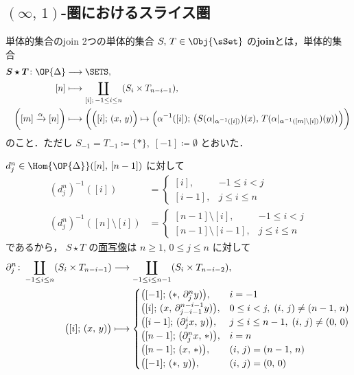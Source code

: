 \documentclass[TQFT_main]{subfiles}
\begin{document}
\subsection{{$(\infty,\, 1)$}-圏におけるスライス圏}

\begin{mydef}[label=def:Simp-Join]{単体的集合のjoin}
    2つの単体的集合 $S,\, T \in \Obj{\sSet}$ の\textbf{join}とは，単体的集合
    \begin{align}
        \bm{S \star T} \colon \OP{\Delta} &\lto \SETS, \\
        [n] &\lmto \coprod_{[i];\, -1 \le i \le n} (S_i \times T_{n-i-1}), \\
        \biggl( [m] \xrightarrow{\alpha} [n] \biggr) &\lmto \biggl( \Bigl( [i];\, (x,\, y) \Bigr) \mapsto \Bigl( \alpha^{-1}([i]);\, \bigl(S(\alpha|_{\alpha^{-1}([i])})(x),\, T(\alpha|_{\alpha^{-1}([m]\setminus[i])})(y) \bigr)  \Bigr)  \biggr) 
    \end{align}
    のこと．ただし $S_{-1} = T_{-1} \coloneqq \{*\},\; [-1] \coloneqq \emptyset$ とおいた．
\end{mydef}
$d^n_j \in \Hom{\OP{\Delta}}([n],\, [n-1])$ に対して
\begin{align}
    (d^n_j)^{-1} ([i]) &= 
    \begin{cases}
        [i], &-1 \le i < j \\
        [i-1], &j \le i \le n
    \end{cases} 
    \\
    (d^n_j)^{-1} ([n]\setminus [i]) &= \begin{cases}
        [n-1]\setminus [i], &-1 \le i < j \\
        [n-1]\setminus [i-1], &j \le i \le n
    \end{cases}
\end{align}
であるから，
$S \star T$ の\hyperref[def:SimpSet]{面写像}は $n \ge 1,\, 0 \le j \le n$ に対して
\begin{align}
    \label{eq:face-join}
    \partial^n_j \colon \coprod_{-1 \le i \le n} (S_i \times T_{n-i-1}) &\longrightarrow \coprod_{-1 \le i \le n-1} (S_i \times T_{n-i-2}), \\
    \bigl([i];\, (x,\, y) \bigr) &\longmapsto 
    \begin{cases}
        \bigl([-1];\, (*,\, \partial^n_j y) \bigr), &i=-1 \\
        \bigl([i];\, (x,\, \partial^{n-i-1}_{j-i-1} y) \bigr), &0 \le i < j,\; (i,\, j) \neq (n-1,\, n) \\
        \bigl([i-1];\, (\partial^i_j x,\, y) \bigr), &j \le i \le n-1,\; (i,\, j) \neq (0,\, 0) \\
        \bigl([n-1];\, (\partial^n_j x,\, *) \bigr), &i=n \\
        \bigl([n-1];\, (x,\, *) \bigr), &(i,\, j) = (n-1,\, n) \\
        \bigl([-1];\, (*,\, y) \bigr), &(i,\, j) = (0,\, 0)
    \end{cases}
\end{align}
\end{document}
